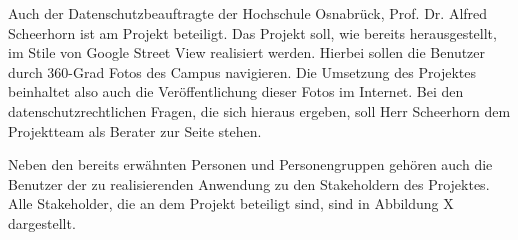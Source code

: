 Auch der Datenschutzbeauftragte der Hochschule Osnabrück, Prof. Dr. Alfred
Scheerhorn ist am Projekt beteiligt. Das Projekt soll, wie bereits
herausgestellt, im Stile von Google Street View realisiert werden. Hierbei
sollen die Benutzer durch 360-Grad Fotos des Campus navigieren. Die Umsetzung
des Projektes beinhaltet also auch die Veröffentlichung dieser Fotos im
Internet. Bei den datenschutzrechtlichen Fragen, die sich hieraus ergeben, soll
Herr Scheerhorn dem Projektteam als Berater zur Seite stehen.

Neben den bereits erwähnten Personen und Personengruppen gehören auch die
Benutzer der zu realisierenden Anwendung zu den Stakeholdern des Projektes.
Alle Stakeholder, die an dem Projekt beteiligt sind, sind in Abbildung X
dargestellt.

